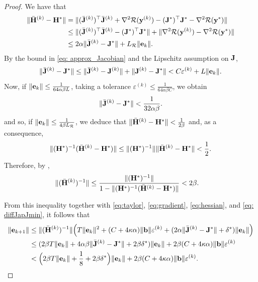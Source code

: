 \documentclass[onefignum,onetabnum]{siamart171218}
\newcommand{\bH}{{\bf H}}
\newcommand{\bJ}{{\bf J}}
\newcommand{\bb}{{\bf b}}
\newcommand{\be}{{\bf e}}
\newcommand{\by}{{\bf y}}
\begin{document}
\begin{proof}
We have that
\begin{align*}
\|\bar\bH^{(k)}-\bH^\ast\|&=\|(\bar\bJ^{(k)})^\top \bar\bJ^{(k)} + \nabla^2 \mathcal{R}(\by^{(k)})- (\bJ^\ast)^\top \bJ^\ast - \nabla^2 \mathcal{R}(\by^*)\| \\
&\le \|(\bar\bJ^{(k)})^\top \bar\bJ^{(k)} - (\bJ^\ast)^\top \bJ^\ast \| + \| \nabla^2 \mathcal{R}(\by^{(k)}) - \nabla^2 \mathcal{R}(\by^*)\| \\
&\le 2\alpha  \|\bar\bJ^{(k)} - \bJ^\ast \| + L_\mathcal{R} \| \be_k\|. 
\end{align*}
By the bound in \eqref{eq: approx_Jacobian} and the Lipschitz assumption on $\bJ$, 
$$\|\bar\bJ^{(k)} - \bJ^\ast \| \le \|\bar\bJ^{(k)} - \bJ^{(k)}\|+\|\bJ^{(k)} - \bJ^\ast \| < C  \varepsilon^{(k)} + L \| \be_{k}\|.$$
Now, if $\|\be_{k}\| \le  \frac{1}{64\alpha \beta L}$, taking a tolerance $\varepsilon^{(k)}\le \frac{1}{64\alpha \beta C}$, we obtain
\begin{equation}\label{eq: diffJapJmin}
\|\bar\bJ^{(k)} - \bJ^\ast \|<\frac{1}{32\alpha \beta}.
\end{equation}
and so, if $\|\be_{k}\| \le  \frac{1}{4\beta L_{\mathcal{R}}}$, we deduce that
$\|\bar\bH^{(k)}-\bH^\ast\|<\frac{1}{2\beta}$
and, as a consequence,
\begin{align*}\|(\bH^\ast)^{-1} (\bar\bH^{(k)}-\bH^\ast)\|\le \|(\bH^\ast)^{-1} \| \| \bar\bH^{(k)}-\bH^\ast\|  < \frac{1}{2}.\end{align*}
Therefore, by \cite[Theorem 3.1.4]{dennisschnabel}, 
\begin{align*}
\|(\bar\bH^{(k)})^{-1}\|& \le  \frac{\|(\bH^\ast)^{-1}\|}{1-\|(\bH^\ast)^{-1} (\bar\bH^{(k)} - \bH^\ast)\|} 
< 2 \beta.
\end{align*}

From this inequality together with \eqref{eq:taylor}, \eqref{eq:gradient},  \eqref{eq:hessian}, and \eqref{eq: diffJapJmin},  it follows that
\begin{align*}
\| \be_{k+1}\|  & \le \|(\bar\bH^{(k)})^{-1}\| \Big(T \|\be_{k}\|^2 +  (C  + 4\kappa \alpha )\| \bb\| \varepsilon^{(k)}  + (2\alpha \|\bar\bJ^{(k)} - \bJ^\ast \| +\delta^\ast) \|\be_{k}\|\Big)\\
& \le (2 \beta T \| \be_k\| + 4\alpha \beta \|\bar\bJ^{(k)} - \bJ^\ast \| + 2\beta \delta^*)\| \be_k\|+ 2\beta (C + 4\kappa \alpha )\| \bb\| \varepsilon^{(k)} \\
& < \Big(2\beta T \|\be_{k}\|+ \frac{1}{8}+2\beta\delta^\ast\Big)\|\be_{k} \|+ 2\beta (C + 4\kappa \alpha )\| \bb\| \varepsilon^{(k)} .
\end{align*}


\end{proof}
\end{document}
